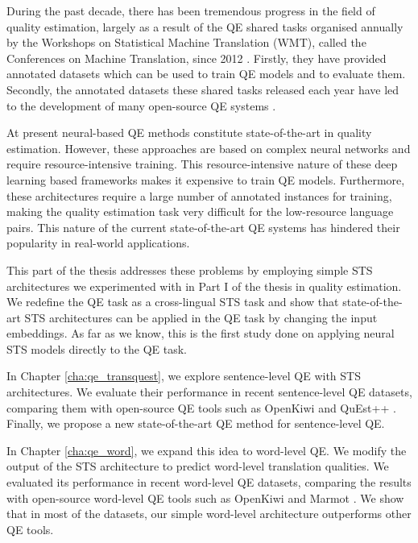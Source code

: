 During the past decade, there has been tremendous progress in the field of quality estimation, largely as a result of the QE shared tasks organised annually by the Workshops on Statistical Machine Translation (WMT), called the Conferences on Machine Translation, since 2012  \autocite{callison-burch-etal-2012-findings,bojar-etal-2013-findings,bojar-etal-2014-findings,bojar-etal-2015-findings,bojar-etal-2016-findings,bojar-etal-2017-findings,specia-etal-2018-findings,fonseca-etal-2019-findings,specia-etal-2020-findings-wmt}. Firstly, they have provided annotated datasets which can be used to train QE models and to evaluate them. Secondly, the annotated datasets these shared tasks released each year have led to the development of many open-source QE systems \autocite{specia-etal-2015-multi, ive-etal-2018-deepquest, kepler-etal-2019-openkiwi}. 

At present neural-based QE methods constitute state-of-the-art in quality estimation. However, these approaches are based on complex neural networks and require resource-intensive training. This resource-intensive nature of these deep learning based frameworks makes it expensive to train QE models. Furthermore, these architectures require a large number of annotated instances for training, making the quality estimation task very difficult for the low-resource language pairs. This nature of the current state-of-the-art QE systems has hindered their popularity in real-world applications.

This part of the thesis addresses these problems by employing simple STS architectures we experimented with in Part I of the thesis in quality estimation. We redefine the QE task as a cross-lingual STS task and show that state-of-the-art STS architectures can be applied in the QE task by changing the input embeddings. As far as we know, this is the first study done on applying neural STS models directly to the QE task. 

In Chapter \ref{cha:qe_transquest}, we explore sentence-level QE with STS architectures. We evaluate their performance in recent sentence-level QE datasets, comparing them with open-source QE tools such as OpenKiwi \autocite{kepler-etal-2019-openkiwi} and QuEst++ \autocite{specia-etal-2015-multi}. Finally, we propose a new state-of-the-art QE method for sentence-level QE.

In Chapter \ref{cha:qe_word}, we expand this idea to word-level QE. We modify the output of the STS architecture to predict word-level translation qualities. We evaluated its performance in recent word-level QE datasets, comparing the results with open-source word-level QE tools such as OpenKiwi \autocite{kepler-etal-2019-openkiwi} and Marmot \autocite{logacheva-etal-2016-marmot}. We show that in most of the datasets, our simple word-level architecture outperforms other QE tools. 

